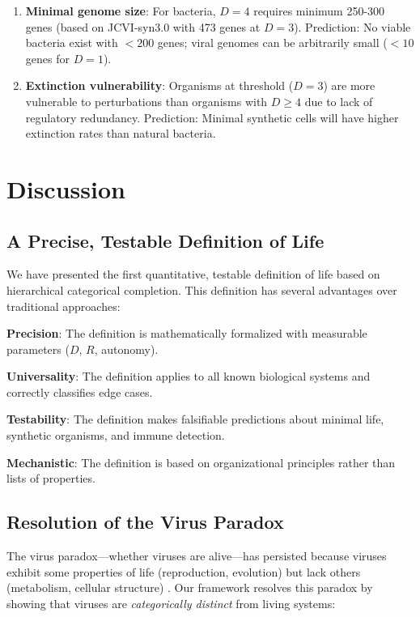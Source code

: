 \documentclass[11pt]{article}
\begin{document}
\begin{enumerate}
\item \textbf{Minimal genome size}: For bacteria, $D = 4$ requires minimum 250-300 genes (based on JCVI-syn3.0 with 473 genes at $D = 3$). Prediction: No viable bacteria exist with $< 200$ genes; viral genomes can be arbitrarily small ($< 10$ genes for $D = 1$).

\item \textbf{Extinction vulnerability}: Organisms at threshold ($D = 3$) are more vulnerable to perturbations than organisms with $D \geq 4$ due to lack of regulatory redundancy. Prediction: Minimal synthetic cells will have higher extinction rates than natural bacteria.
\end{enumerate}

\section{Discussion}

\subsection{A Precise, Testable Definition of Life}

We have presented the first quantitative, testable definition of life based on hierarchical categorical completion. This definition has several advantages over traditional approaches:

\textbf{Precision}: The definition is mathematically formalized with measurable parameters ($D$, $R$, autonomy).

\textbf{Universality}: The definition applies to all known biological systems and correctly classifies edge cases.

\textbf{Testability}: The definition makes falsifiable predictions about minimal life, synthetic organisms, and immune detection.

\textbf{Mechanistic}: The definition is based on organizational principles rather than lists of properties.

\subsection{Resolution of the Virus Paradox}

The virus paradox—whether viruses are alive—has persisted because viruses exhibit some properties of life (reproduction, evolution) but lack others (metabolism, cellular structure) \citep{Raoult2004, Forterre2010, Moreira2009}. Our framework resolves this paradox by showing that viruses are \textit{categorically distinct} from living systems:
\end{document}
